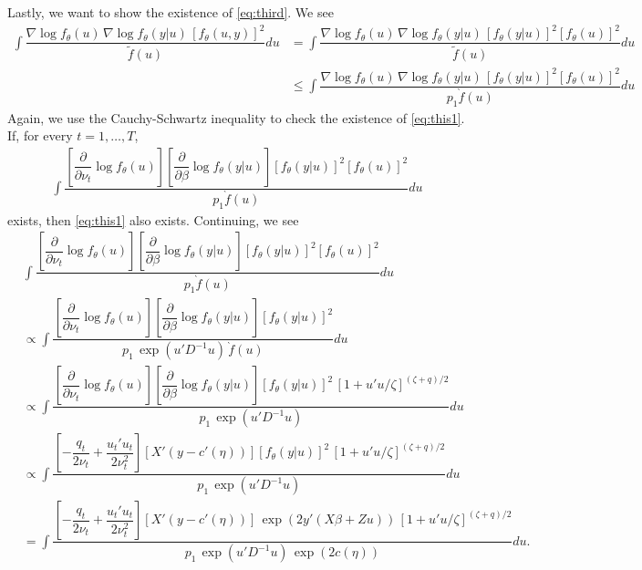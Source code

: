 \documentclass{article}
\begin{document}
Lastly, we want to show the existence of \eqref{eq:third}. We see
\begin{align}
\int \dfrac{  \nabla \log f_\theta (u)\,  \nabla \log f_\theta (y|u) \, \left[ f_\theta(u,y)\right]^2}{\tilde{f}(u)} du &=
\int \dfrac{  \nabla \log f_\theta (u) \, \nabla \log f_\theta (y|u) \, \left[ f_\theta(y|u)\right]^2 \left[ f_\theta(u)\right]^2}{\tilde{f}(u)} du \\
&\leq
\int \dfrac{  \nabla \log f_\theta (u) \,  \nabla \log f_\theta (y|u)\,  \left[ f_\theta(y|u)\right]^2 \left[ f_\theta(u)\right]^2}{p_1 \grave{f}(u)} du \label{eq:this1}
\end{align}
Again, we use the Cauchy-Schwartz inequality to check the existence of \eqref{eq:this1}. If, for every $t=1,\ldots,T$,
\begin{align}
\int \dfrac{ \left[ \dfrac{\partial}{\partial \nu_t}  \log f_\theta (u) \right] \left[  \dfrac{\partial}{\partial \beta} \log f_\theta (y|u) \right]   \left[ f_\theta(y|u)\right]^2 \left[ f_\theta(u)\right]^2}{p_1 \grave{f}(u)} du \label{eq:this1}
\end{align}
exists, then \eqref{eq:this1} also exists. Continuing, we see
\begin{align}
& \int \dfrac{ \left[ \dfrac{\partial}{\partial \nu_t}  \log f_\theta (u) \right] \left[  \dfrac{\partial}{\partial \beta} \log f_\theta (y|u) \right]   \left[ f_\theta(y|u)\right]^2 \left[ f_\theta(u)\right]^2}{p_1 \grave{f}(u)} du\\
 &\propto \int \dfrac{ \left[ \dfrac{\partial}{\partial \nu_t}  \log f_\theta (u) \right] \left[  \dfrac{\partial}{\partial \beta} \log f_\theta (y|u) \right]   \left[ f_\theta(y|u)\right]^2 }{p_1 \, \exp(u'D^{-1}u) \, \grave{f}(u)} du\\
 &\propto \int \dfrac{ \left[ \dfrac{\partial}{\partial \nu_t}  \log f_\theta (u) \right] \left[  \dfrac{\partial}{\partial \beta} \log f_\theta (y|u) \right]   \left[ f_\theta(y|u)\right]^2 \, \left[ 1+u'u/\zeta  \right]^{(\zeta+q)/2} }{p_1 \, \exp(u'D^{-1}u) } du\\
&\propto \int \dfrac{ \left[      -\dfrac{q_t}{2 \nu_t} + \dfrac{u_t'u_t}{2 \nu_t^2}        \right] \left[  X'(y-c'(\eta)) \right]   \left[ f_\theta(y|u)\right]^2 \, \left[ 1+u'u/\zeta  \right]^{(\zeta+q)/2} }{p_1 \, \exp(u'D^{-1}u) } du\\
&= \int \dfrac{ \left[      -\dfrac{q_t}{2 \nu_t} + \dfrac{u_t'u_t}{2 \nu_t^2}        \right] \left[  X'(y-c'(\eta)) \right]   \, \exp(2y'(X\beta+Zu)) \, \left[ 1+u'u/\zeta  \right]^{(\zeta+q)/2} }{p_1 \, \exp(u'D^{-1}u) \, \exp(2 c(\eta)) } du. \label{eq:this2}
\end{align}
\end{document}
